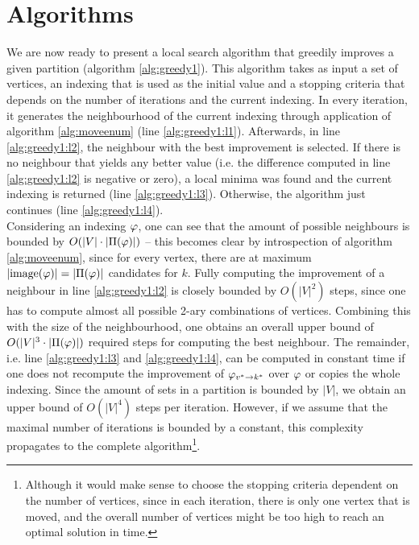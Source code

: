 

\section{Algorithms}

We are now ready to present a local search algorithm that greedily improves a given partition (algorithm \ref{alg:greedy1}). This algorithm takes as input a set of vertices, an indexing that is used as the initial value and a stopping criteria that depends on the number of iterations and the current indexing. In every iteration, it generates the neighbourhood of the current indexing through application of algorithm \ref{alg:moveenum} (line \ref{alg:greedy1:l1}). Afterwards, in line \ref{alg:greedy1:l2}, the neighbour with the best improvement is selected. If there is no neighbour that yields any better value (i.e. the difference computed in line \ref{alg:greedy1:l2} is negative or zero), a local minima was found and the current indexing is returned (line \ref{alg:greedy1:l3}). Otherwise, the algorithm just continues (line \ref{alg:greedy1:l4}). \\
Considering an indexing $\varphi$, one can see that the amount of possible neighbours is bounded by $O(|V| \cdot |\Pi(\varphi) |)$ -- this becomes clear by introspection of algorithm \ref{alg:moveenum}, since for every vertex, there are at maximum $|\mathrm{image}(\varphi)| = |\Pi(\varphi)|$ candidates for $k$. Fully computing the improvement of a neighbour in line \ref{alg:greedy1:l2} is closely bounded by $O(|V|^2)$ steps, since one has to compute almost all possible 2-ary combinations of vertices. Combining this with the size of the neighbourhood, one obtains an overall upper bound of $O(|V|^3 \cdot |\Pi(\varphi)|)$ required steps for computing the best neighbour. The remainder, i.e. line \ref{alg:greedy1:l3} and \ref{alg:greedy1:l4}, can be computed in constant time if one does not recompute the improvement of $\varphi_{v^*\rightarrow k^*}$ over $\varphi$ or copies the whole indexing. Since the amount of sets in a partition is bounded by $|V|$, we obtain an upper bound of $O(|V|^4)$ steps per iteration. However, if we assume that the maximal number of iterations is bounded by a constant, this complexity propagates to the complete algorithm\footnote{Although it would make sense to choose the stopping criteria dependent on the number of vertices, since in each iteration, there is only one vertex that is moved, and the overall number of vertices might be too high to reach an optimal solution in time.}.

